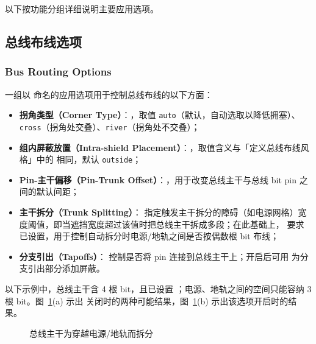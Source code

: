 以下按功能分组详细说明主要应用选项。

\subsection{总线布线选项}
\subsubsection*{Bus Routing Options}

一组以  命名的应用选项用于控制总线布线的以下方面：

\begin{itemize}
  \item \textbf{拐角类型（Corner Type）}：，取值 \texttt{auto}（默认，自动选取以降低拥塞）、\texttt{cross}（拐角处交叠）、\texttt{river}（拐角处不交叠）；
  \item \textbf{组内屏蔽放置（Intra-shield Placement）}：，取值含义与「定义总线布线风格」中的  相同，默认 \texttt{outside}；
  \item \textbf{Pin-主干偏移（Pin-Trunk Offset）}：，用于改变总线主干与总线 bit pin 之间的默认间距；
  \item \textbf{主干拆分（Trunk Splitting）}： 指定触发主干拆分的障碍（如电源网格）宽度阈值，即当遮挡宽度超过该值时把总线主干拆成多段；在此基础上， 要求  已设置，用于控制自动拆分时电源/地轨之间是否按偶数根 bit 布线；
  \item \textbf{分支引出（Tapoffs）}： 控制是否将 pin 连接到总线主干上；开启后可用  为分支引出部分添加屏蔽。
\end{itemize}

以下示例中，总线主干含 4 根 bit，且已设置 ；电源、地轨之间的空间只能容纳 3 根 bit。图~\ref{fig:bus-split-even-bits}(a) 示出  关闭时的两种可能结果，图~\ref{fig:bus-split-even-bits}(b) 示出该选项开启时的结果。

\begin{figure}[htbp]
\centering
{}
\caption{总线主干为穿越电源/地轨而拆分}
\label{fig:bus-split-even-bits}
\end{figure}

